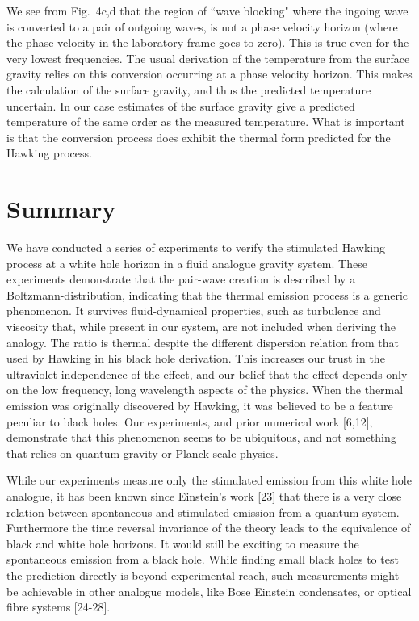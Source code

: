 \documentclass[12pt,aps%
]{revtex4}
\begin{document}
We see from Fig.\ 4c,d that the region of ``wave blocking" where the ingoing
wave is converted to a pair of outgoing waves, is not a phase velocity horizon
(where the phase velocity in the laboratory frame goes to zero). This is true
even for the very lowest frequencies.  The usual derivation of the temperature
from the surface gravity relies on this conversion occurring at a phase
velocity horizon. This makes the calculation of the surface gravity, and thus
the predicted temperature uncertain. In our case estimates of the surface
gravity give a predicted temperature of the same order as the measured
temperature. What is important is that the conversion process does exhibit the
thermal form predicted for the Hawking process. 

\section{Summary}

We have conducted a series of experiments to verify the stimulated Hawking
process at a white hole horizon in a fluid analogue gravity system. These
experiments demonstrate that the pair-wave creation is described by a
Boltzmann-distribution, indicating that the thermal emission process is a
generic phenomenon. It survives fluid-dynamical properties, such as turbulence
and viscosity that, while present in our system, are not included when
deriving the analogy. The ratio is thermal despite the different
dispersion relation from that used by Hawking in his black hole derivation.
This increases our trust in the ultraviolet independence of the effect, and
our belief that the effect depends only on the low frequency, long wavelength
aspects of the physics. When the thermal emission was originally discovered by
Hawking, it was believed to be a feature peculiar to black holes. Our
experiments, and prior numerical work [6,12], demonstrate that this phenomenon
seems to be ubiquitous, and not something that relies on quantum gravity or
Planck-scale physics. 

While our experiments measure only the stimulated emission from this white
hole analogue, it has been known since Einstein's work [23] that there is a
very close relation between spontaneous and stimulated emission from a quantum
system. Furthermore the time reversal invariance of the theory leads to the
equivalence of black and white hole horizons. It would still be exciting to
measure the spontaneous emission from a black hole. While finding small black
holes to test the prediction directly is beyond experimental reach, such
measurements might be achievable in other analogue models, like Bose Einstein
condensates, or optical fibre systems [24-28].
\end{document}
